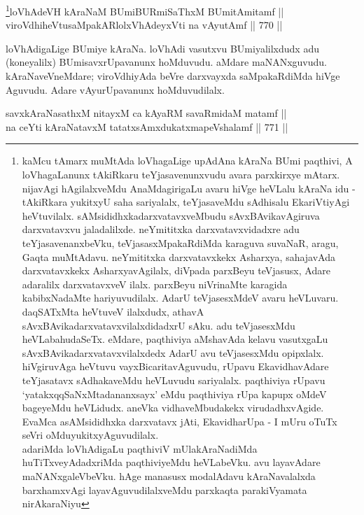 \begin{shl}
\footnote{kaMcu tAmarx muMtAda loVhagaLige upAdAna kAraNa BUmi paqthivi, A loVhagaLanunx tAkiRkaru teYjasavenunxvudu avara parxkirxye mAtarx. nijavAgi hAgilalxveMdu AnaMdagirigaLu avaru hiVge heVLalu kAraNa idu - tAkiRkara yukitxyU saha sariyalalx, teYjasaveMdu sAdhisalu EkariVtiyAgi heVtuvilalx. sAMsididhxkadarxvatavxveMbudu sAvxBAvikavAgiruva darxvatavxvu jaladalilxde. neYmititxka darxvatavxvidadxre adu teYjasavenanxbeVku, teVjasasxMpakaRdiMda karaguva suvaNaR, aragu, Gaqta muMtAdavu. neYmititxka darxvatavxkekx Asharxya, sahajavAda darxvatavxkekx AsharxyavAgilalx, diVpada parxBeyu teVjasusx, Adare adaralilx darxvatavxveV ilalx. parxBeyu niVrinaMte karagida kabibxNadaMte hariyuvu\-dilalx. AdarU teVjasesxMdeV avaru heVLuvaru. daqSATxMta heVtuveV ilalxdudx, athavA sAvxBAvikadarxvatavx\-vilalxdidadxrU sAku. adu teVjasesxMdu heVLabahudaSeTx. eMdare, paqthiviya aMshavAda kelavu vasutxgaLu sAvxBAvikadarxvatavxvilalxdedx AdarU avu teVjasesxMdu opipxlalx. hiVgiruvAga heVtuvu vayxBicaritavAguvudu, rUpavu EkavidhavAdare teYjasatavx sAdhakaveMdu heVLuvudu sariyalalx. paqthiviya rUpavu `yatakxqqSaNxMtadananxsayx' eMdu paqthiviya rUpa kapupx oMdeV bageyeMdu heVLidudx. aneVka vidhaveMbudakekx virudadhxvAgide. EvaMca asAMsididhxka darxvatavx jAti, EkavidharUpa - I mUru oTuTx seVri oMdu\break yukitxyAguvudilalx.\\ adariMda loVhAdigaLu paqthiviV mUlakAraNadiMda huTiTxveyAdadxriMda paqthiviyeMdu heVLabeVku. avu layavAdare maNANxgaleVbeVku. hAge manasusx modalAdavu kAraNavalalxda barxhamxvAgi layavAguvudilalxveMdu parxkaqta parakiVyamata nirAkaraNiyu}loVhAdeVH kAraNaM BUmiBURmiSaThxM BUmitAmitamf || \\
viroVdhiheVtusaMpakARlolxVhAdeyxVti na vAyutAmf \hfill || 770 ||  
\end{shl}

\begin{artha} 
loVhAdigaLige BUmiye kAraNa. loVhAdi vasutxvu BUmiyalilxdudx adu (koneyalilx) BUmisavxrUpavanunx hoMduvudu. aMdare maNANxguvudu. kAraNaveVneMdare; viroVdhiyAda beVre darxvayxda saMpakaRdiMda hiVge Aguvudu. Adare vAyurUpavanunx hoMduvudilalx.
\end{artha}


\begin{shl}
savxkAraNasathxM nitayxM ca kAyaRM savaRmidaM matamf || \\
na ceYti kAraNatavxM tatatxsAmxdukatxmapeVshalamf \hfill || 771 ||  
\end{shl}

